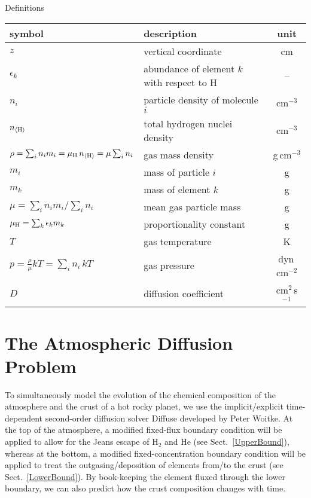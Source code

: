 \documentclass[11pt]{article}
\def\nH{n_{\langle\rm H\rangle}}
\def\ek{\epsilon_k}
\begin{document}


\centerline{Definitions}

\begin{tabular}{l|l|c}
\hline
symbol  & description & unit\\
\hline
$z$                       & vertical coordinate    & cm\\
$\ek$                     & abundance of element $k$ 
                            with respect to H      & --\\
$n_i$                     & particle density of molecule $i$ & cm$^{-3}$\\
$\nH$                     & total hydrogen nuclei density & cm$^{-3}$\\
$\rho = \sum_i n_i m_i = \mu_{\rm H}\,\nH = \mu \sum_i n_i$  
                          & gas mass density       & g\,cm$^{-3}$\\
$m_i$                     & mass of particle $i$   & g\\
$m_k$                     & mass of element $k$    & g\\
$\mu = {\sum_i n_i m_i}\Big/{\sum_i n_i}$ 
                          & mean gas particle mass & g\\
$\mu_{\rm H} = \sum_k \epsilon_k m_k$   
                          & proportionality constant & g\\
$T$                       & gas temperature        & K\\
$p = \frac{\rho}{\mu}kT = \sum_i n_i\,kT$  
                          & gas pressure           & dyn\,cm$^{-2}$\\
$D$                       & diffusion coefficient  & cm$^2$\,s$^{-1}$\\
\hline  
\end{tabular}

\bigskip
\section{The Atmospheric Diffusion Problem}

To simultaneously model the evolution of the chemical composition of
the atmosphere and the crust of a hot rocky planet, we use the
implicit/explicit time-dependent second-order diffusion solver {\sc
  Diffuse} developed by Peter Woitke.  At the top of the atmosphere, a
modified fixed-flux boundary condition will be applied to allow for
the Jeans escape of H$_2$ and He (see Sect.~\ref{UpperBound}), whereas
at the bottom, a modified fixed-concentration boundary condition will
be applied to treat the outgasing/deposition of elements from/to the
crust (see Sect.~\ref{LowerBound}). By book-keeping the element fluxed
through the lower boundary, we can also predict how the crust
composition changes with time.
 
\end{document}

